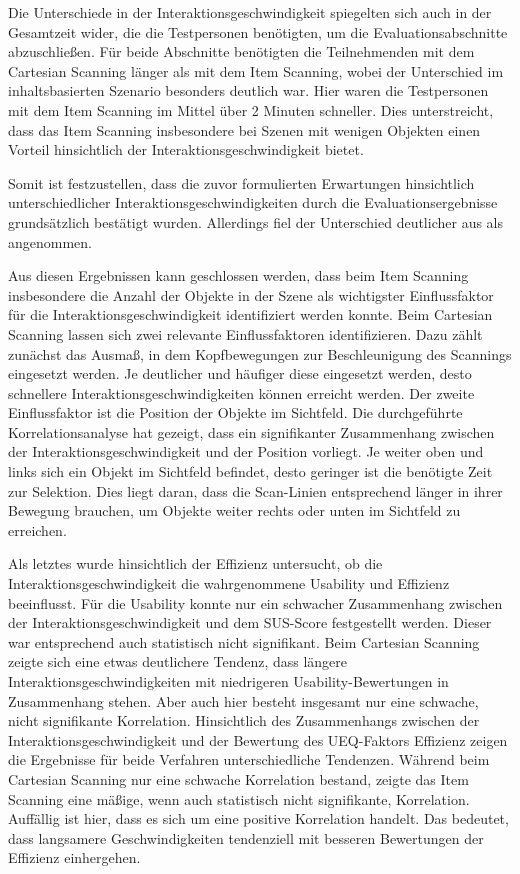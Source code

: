 Die Unterschiede in der Interaktionsgeschwindigkeit spiegelten sich auch in der Gesamtzeit wider, die die Testpersonen benötigten, um die Evaluationsabschnitte abzuschließen. Für beide Abschnitte benötigten die Teilnehmenden mit dem Cartesian Scanning länger als mit dem Item Scanning, wobei der Unterschied im inhaltsbasierten Szenario besonders deutlich war. Hier waren die Testpersonen mit dem Item Scanning im Mittel über 2 Minuten schneller. Dies unterstreicht, dass das Item Scanning insbesondere bei Szenen mit wenigen Objekten einen Vorteil hinsichtlich der Interaktionsgeschwindigkeit bietet.

Somit ist festzustellen, dass die zuvor formulierten Erwartungen hinsichtlich unterschiedlicher Interaktionsgeschwindigkeiten durch die Evaluationsergebnisse grundsätzlich bestätigt wurden. Allerdings fiel der Unterschied deutlicher aus als angenommen. 

Aus diesen Ergebnissen kann geschlossen werden, dass beim Item Scanning insbesondere die Anzahl der Objekte in der Szene als wichtigster Einflussfaktor für die Interaktionsgeschwindigkeit identifiziert werden konnte. Beim Cartesian Scanning lassen sich zwei relevante Einflussfaktoren identifizieren. Dazu zählt zunächst das Ausmaß, in dem Kopfbewegungen zur Beschleunigung des Scannings eingesetzt werden. Je deutlicher und häufiger diese eingesetzt werden, desto schnellere Interaktionsgeschwindigkeiten können erreicht werden. Der zweite Einflussfaktor ist die Position der Objekte im Sichtfeld. Die durchgeführte Korrelationsanalyse hat gezeigt, dass ein signifikanter Zusammenhang zwischen der Interaktionsgeschwindigkeit und der Position vorliegt. Je weiter oben und links sich ein Objekt im Sichtfeld befindet, desto geringer ist die benötigte Zeit zur Selektion. Dies liegt daran, dass die Scan-Linien entsprechend länger in ihrer Bewegung brauchen, um Objekte weiter rechts oder unten im Sichtfeld zu erreichen. 

Als letztes wurde hinsichtlich der Effizienz untersucht, ob die Interaktionsgeschwindigkeit die wahrgenommene Usability und Effizienz beeinflusst. Für die Usability konnte nur ein schwacher Zusammenhang zwischen der Interaktionsgeschwindigkeit und dem SUS-Score festgestellt werden. Dieser war entsprechend auch statistisch nicht signifikant. Beim Cartesian Scanning zeigte sich eine etwas deutlichere Tendenz, dass längere Interaktionsgeschwindigkeiten mit niedrigeren Usability-Bewertungen in Zusammenhang stehen. Aber auch hier besteht insgesamt nur eine schwache, nicht signifikante Korrelation. 
Hinsichtlich des Zusammenhangs zwischen der Interaktionsgeschwindigkeit und der Bewertung des UEQ-Faktors Effizienz zeigen die Ergebnisse für beide Verfahren unterschiedliche Tendenzen. Während beim Cartesian Scanning nur eine schwache Korrelation bestand, zeigte das Item Scanning eine mäßige, wenn auch statistisch nicht signifikante, Korrelation. Auffällig ist hier, dass es sich um eine positive Korrelation handelt. Das bedeutet, dass langsamere Geschwindigkeiten tendenziell mit besseren Bewertungen der Effizienz einhergehen. %

